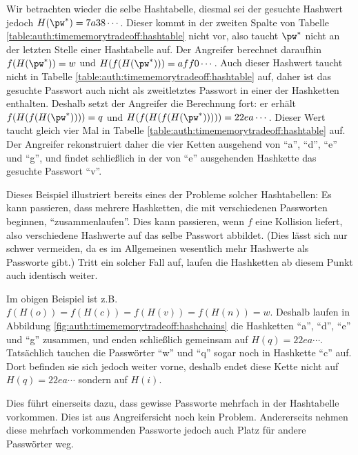 \begin{beispiel}
	Wir betrachten wieder die selbe Hashtabelle, diesmal sei der gesuchte Hashwert jedoch $H(\pw^*) = 7a38\cdots$.
	Dieser kommt in der zweiten Spalte von Tabelle \ref{table:auth:timememorytradeoff:hashtable} nicht vor, also taucht $\pw^*$ nicht an der letzten Stelle einer Hashtabelle auf.
	Der Angreifer berechnet daraufhin $f(H(\pw^*)) = w$ und $H(f(H(\pw^*))) = aff0\cdots$. Auch dieser Hashwert taucht nicht in Tabelle \ref{table:auth:timememorytradeoff:hashtable} auf, daher ist das gesuchte Passwort auch nicht als zweitletztes Passwort in einer der Hashketten enthalten.
	Deshalb setzt der Angreifer die Berechnung fort: er erhält $f(H(f(H(\pw^*)))) = q$ und $H(f(H(f(H(\pw^*))))) = 22ea\cdots$. Dieser Wert taucht gleich vier Mal in Tabelle \ref{table:auth:timememorytradeoff:hashtable} auf. Der Angreifer rekonstruiert daher die vier Ketten ausgehend von "`a"', "`d"', "`e"' und "`g"', und findet schließlich in der von "`e"' ausgehenden Hashkette das gesuchte Passwort "`v"'.\\
\end{beispiel}

Dieses Beispiel illustriert bereits eines der Probleme solcher Hashtabellen:
Es kann passieren, dass mehrere Hashketten, die mit verschiedenen Passworten beginnen, "`zusammenlaufen"'.
Dies kann passieren, wenn $f$ eine Kollision liefert, also verschiedene Hashwerte auf das selbe Passwort abbildet. (Dies lässt sich nur schwer vermeiden, da es im Allgemeinen wesentlich mehr Hashwerte als Passworte gibt.)
Tritt ein solcher Fall auf, laufen die Hashketten ab diesem Punkt auch identisch weiter.

Im obigen Beispiel ist z.B. $f(H(o)) = f(H(c)) = f(H(v)) = f(H(n)) = w$. Deshalb laufen in  Abbildung \ref{fig:auth:timememorytradeoff:hashchains} die Hashketten "`a"', "`d"', "`e"' und "`g"' zusammen, und enden schließlich gemeinsam auf $H(q) = 22ea\cdots$. Tatsächlich tauchen die 
Passwörter "`w"' und "`q"' sogar noch in Hashkette "`c"' auf. Dort befinden sie sich jedoch weiter vorne, deshalb endet diese Kette nicht auf $H(q) = 22ea\cdots$ sondern auf $H(i)$.

Dies führt einerseits dazu, dass gewisse Passworte mehrfach in der Hashtabelle vorkommen. Dies ist aus Angreifersicht noch kein Problem. Andererseits nehmen diese mehrfach vorkommenden Passworte jedoch auch Platz für andere Passwörter weg.\\


